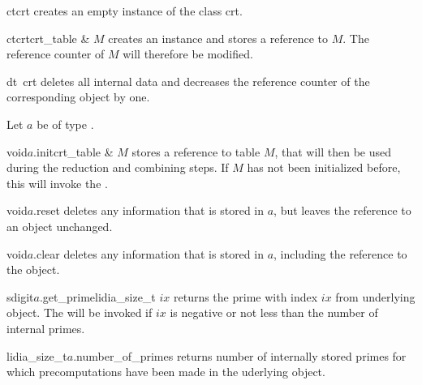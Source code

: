 
\CONS
\begin{fcode}{ct}{crt}{}
  creates an empty instance of the class crt.
\end{fcode}

\begin{fcode}{ct}{crt}{crt_table & $M$}
  creates an instance and stores a reference to $M$.  The reference counter of $M$ will
  therefore be modified.
\end{fcode}

\begin{fcode}{dt}{~crt}{}
  deletes all internal data and decreases the reference counter of the corresponding
   object by one.
\end{fcode}



\INIT

Let $a$ be of type .

\begin{fcode}{void}{$a$.init}{crt_table & $M$}
  stores a reference to table $M$, that will then be used during the reduction and combining
  steps.  If $M$ has not been initialized before, this will invoke the \LEH.
\end{fcode}


\begin{fcode}{void}{$a$.reset}{}
  deletes any information that is stored in $a$, but leaves the reference to an 
  object unchanged.
\end{fcode}


\begin{fcode}{void}{$a$.clear}{}
  deletes any information that is stored in $a$, including the reference to the 
  object.
\end{fcode}



\BASIC
\begin{cfcode}{sdigit}{$a$.get_prime}{lidia_size_t $ix$}
  returns the prime with index $ix$ from underlying  object.  The \LEH will be
  invoked if $ix$ is negative or not less than the number of internal primes.
\end{cfcode}

\begin{cfcode}{lidia_size_t}{$a$.number_of_primes}{}
  returns number of internally stored primes for which precomputations have been made in the
  uderlying  object.
\end{cfcode}

